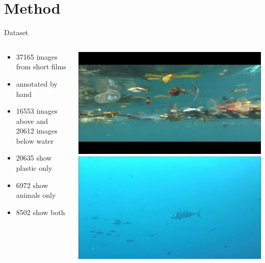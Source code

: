 \documentclass{beamer}
\begin{document}
\section{Method}
    \begin{frame}{Dataset}
        \begin{columns}[c]
            \begin{column}{.5\textwidth}
                \begin{itemize}
                \item 37165 images from short films
                \item annotated by hand
                \item 16553 images above and 20612 images below water
                \item 20635 show plastic only
                \item 6972 show animals only
                \item 8502 show both
                \end{itemize}
            \end{column}
            \begin{column}{.4\textwidth}
                \includegraphics[width=\textwidth]{images/10947_01.jpg}\\
                \includegraphics[width=\textwidth]{images/19358_10.jpg}\\

\end{column}
\end{columns}
\end{frame}
\end{document}
